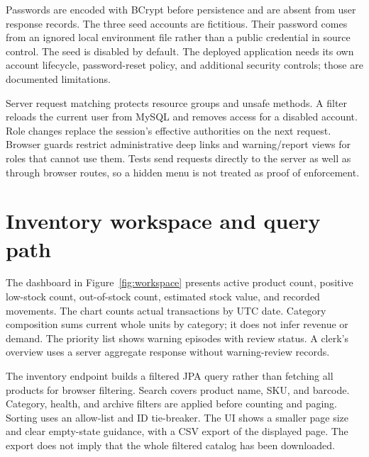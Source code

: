 
Passwords are encoded with BCrypt before persistence and are absent from user response records. The three seed accounts are fictitious. Their password comes from an ignored local environment file rather than a public credential in source control. The seed is disabled by default. The deployed application needs its own account lifecycle, password-reset policy, and additional security controls; those are documented limitations.

Server request matching protects resource groups and unsafe methods. A filter reloads the current user from MySQL and removes access for a disabled account. Role changes replace the session's effective authorities on the next request. Browser guards restrict administrative deep links and warning/report views for roles that cannot use them. Tests send requests directly to the server as well as through browser routes, so a hidden menu is not treated as proof of enforcement.

\section{Inventory workspace and query path}
The dashboard in Figure~\ref{fig:workspace} presents active product count, positive low-stock count, out-of-stock count, estimated stock value, and recorded movements. The chart counts actual transactions by UTC date. Category composition sums current whole units by category; it does not infer revenue or demand. The priority list shows warning episodes with review status. A clerk's overview uses a server aggregate response without warning-review records.


The inventory endpoint builds a filtered JPA query rather than fetching all products for browser filtering. Search covers product name, SKU, and barcode. Category, health, and archive filters are applied before counting and paging. Sorting uses an allow-list and ID tie-breaker. The UI shows a smaller page size and clear empty-state guidance, with a CSV export of the displayed page. The export does not imply that the whole filtered catalog has been downloaded.


